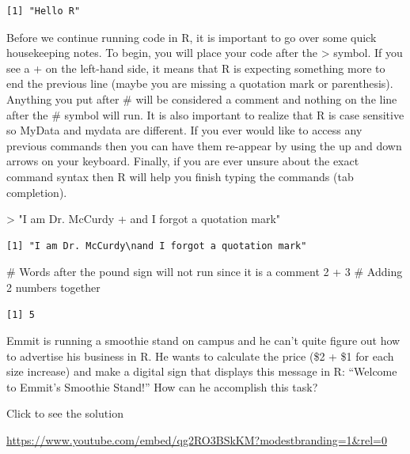 \documentclass[
  letterpaper,
  DIV=11,
  numbers=noendperiod]{scrreprt}
\newenvironment{Shaded}{\begin{snugshade}}{\end{snugshade}}
\newcommand{\CommentTok}[1]{\textcolor[rgb]{0.37,0.37,0.37}{#1}}
\newcommand{\DecValTok}[1]{\textcolor[rgb]{0.68,0.00,0.00}{#1}}
\newcommand{\SpecialCharTok}[1]{\textcolor[rgb]{0.37,0.37,0.37}{#1}}
\newcommand{\StringTok}[1]{\textcolor[rgb]{0.13,0.47,0.30}{#1}}
\begin{document}
\begin{verbatim}
[1] "Hello R"
\end{verbatim}

Before we continue running code in R, it is important to go over some
quick housekeeping notes. To begin, you will place your code after the
\textgreater{} symbol. If you see a + on the left-hand side, it means
that R is expecting something more to end the previous line (maybe you
are missing a quotation mark or parenthesis). Anything you put after \#
will be considered a comment and nothing on the line after the \# symbol
will run. It is also important to realize that R is case sensitive so
MyData and mydata are different. If you ever would like to access any
previous commands then you can have them re-appear by using the up and
down arrows on your keyboard. Finally, if you are ever unsure about the
exact command syntax then R will help you finish typing the commands
(tab completion).

\begin{Shaded}
\begin{Highlighting}[]
\SpecialCharTok{\textgreater{}} \StringTok{"I am Dr. McCurdy}
\StringTok{+ and I forgot a quotation mark"}
\end{Highlighting}
\end{Shaded}

\begin{verbatim}
[1] "I am Dr. McCurdy\nand I forgot a quotation mark"
\end{verbatim}

\begin{Shaded}
\begin{Highlighting}[]
\CommentTok{\# Words after the pound sign will not run since it is a comment}
\DecValTok{2} \SpecialCharTok{+} \DecValTok{3} \CommentTok{\# Adding 2 numbers together}
\end{Highlighting}
\end{Shaded}

\begin{verbatim}
[1] 5
\end{verbatim}

\begin{tcolorbox}[enhanced jigsaw, colbacktitle=quarto-callout-tip-color!10!white, breakable, bottomrule=.15mm, colframe=quarto-callout-tip-color-frame, left=2mm, opacitybacktitle=0.6, title=\textcolor{quarto-callout-tip-color}{\faLightbulb}\hspace{0.5em}{Try it Out}, leftrule=.75mm, opacityback=0, rightrule=.15mm, titlerule=0mm, bottomtitle=1mm, colback=white, toprule=.15mm, arc=.35mm, toptitle=1mm, coltitle=black]

Emmit is running a smoothie stand on campus and he can't quite figure
out how to advertise his business in R. He wants to calculate the price
(\$2 + \$1 for each size increase) and make a digital sign that displays
this message in R: ``Welcome to Emmit's Smoothie Stand!'' How can he
accomplish this task?

Click to see the solution

\url{https://www.youtube.com/embed/qg2RO3BSkKM?modestbranding=1&rel=0}

\end{tcolorbox}
\end{document}
